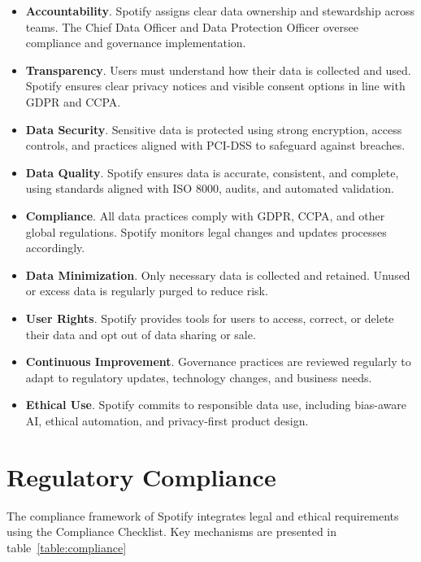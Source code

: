 \documentclass[11pt,a4paper,computermodern]{article}
\begin{document}
\begin{itemize}[itemsep=5pt, parsep=0pt]
	\item \textbf{Accountability}. Spotify assigns clear data ownership and stewardship across teams. The Chief Data Officer and Data Protection Officer oversee compliance and governance implementation.
	\item \textbf{Transparency}. Users must understand how their data is collected and used. Spotify ensures clear privacy notices and visible consent options in line with GDPR and CCPA.
	\item \textbf{Data Security}. Sensitive data is protected using strong encryption, access controls, and practices aligned with PCI-DSS to safeguard against breaches.
	\item \textbf{Data Quality}. Spotify ensures data is accurate, consistent, and complete, using standards aligned with ISO 8000, audits, and automated validation.
	\item \textbf{Compliance}. All data practices comply with GDPR, CCPA, and other global regulations. Spotify monitors legal changes and updates processes accordingly.
	\item \textbf{Data Minimization}. Only necessary data is collected and retained. Unused or excess data is regularly purged to reduce risk.
	\item \textbf{User Rights}. Spotify provides tools for users to access, correct, or delete their data and opt out of data sharing or sale.
	\item \textbf{Continuous Improvement}. Governance practices are reviewed regularly to adapt to regulatory updates, technology changes, and business needs.
	\item \textbf{Ethical Use}. Spotify commits to responsible data use, including bias-aware AI, ethical automation, and privacy-first product design.
\end{itemize}



\section*{Regulatory Compliance}

The compliance framework of Spotify integrates legal and ethical requirements using the Compliance Checklist. Key mechanisms are presented in table~\ref{table:compliance}
\end{document}
